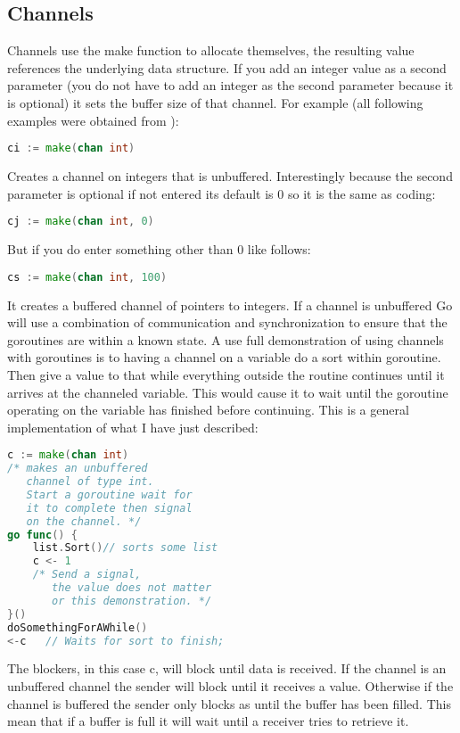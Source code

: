 \subsection{Channels}
Channels use the make function to allocate themselves, the resulting value references the underlying data structure. If you add an integer value as a second parameter (you do not have to add an integer as the second parameter because it is optional) it sets the buffer size of that channel. For example (all following examples were obtained from \cite{website:go-lang-documentation}): 
\begin{lstlisting}[language=Go]
ci := make(chan int)
\end{lstlisting}
Creates a channel on integers that is unbuffered. Interestingly because the second parameter is optional if not entered its default is 0 so it is the same as coding:
\begin{lstlisting}[language=Go]
cj := make(chan int, 0)
\end{lstlisting}
But if you do enter something other than 0 like follows:
\begin{lstlisting}[language=Go]
cs := make(chan int, 100) 
\end{lstlisting}
It creates a buffered channel of pointers to integers. 
If a channel is unbuffered Go will use a combination of communication and synchronization to ensure that the goroutines are within a known state.  A use full demonstration of using channels with goroutines is to having a channel on a variable do a sort within goroutine. Then give a value to that while everything outside the routine continues until it arrives at the channeled variable. This would cause it to wait until the goroutine operating on the variable has finished before continuing.  This is a general implementation of what I have just described:
\begin{lstlisting}[language=Go]
c := make(chan int)  
/* makes an unbuffered 
   channel of type int.
   Start a goroutine wait for
   it to complete then signal 
   on the channel. */
go func() {
    list.Sort()// sorts some list 
    c <- 1  
    /* Send a signal, 
       the value does not matter 
       or this demonstration. */
}()
doSomethingForAWhile()
<-c   // Waits for sort to finish; 
\end{lstlisting}
The blockers, in this case c, will block until data is received. If the channel is an unbuffered channel the sender will block until it receives a value. Otherwise if the channel is buffered the sender only blocks as until the buffer has been filled. This mean that if a buffer is full it will wait until a receiver tries to retrieve it. 
